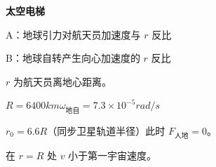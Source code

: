\textbf{太空电梯}


A：地球引力对航天员加速度与 $r$ 反比

B：地球自转产生向心加速度的 $r$ 反比%

$r$ 为航天员离地心距离。

$R=6400\unit{km}$\quad $\omega_{\text{地自}}=7.3\times10^{-5}\unit{rad/s}$

$r_0=6.6R$（同步卫星轨道半径）\quad 此时 $F_{\text{人地}}=0$。

在 $r=R$ 处 $v$ 小于第一宇宙速度。

